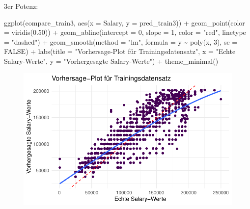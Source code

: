 \documentclass[
  letterpaper,
  DIV=11,
  numbers=noendperiod]{scrartcl}
\newenvironment{Shaded}{\begin{snugshade}}{\end{snugshade}}
\newcommand{\AttributeTok}[1]{\textcolor[rgb]{0.40,0.45,0.13}{#1}}
\newcommand{\ConstantTok}[1]{\textcolor[rgb]{0.56,0.35,0.01}{#1}}
\newcommand{\DecValTok}[1]{\textcolor[rgb]{0.68,0.00,0.00}{#1}}
\newcommand{\FloatTok}[1]{\textcolor[rgb]{0.68,0.00,0.00}{#1}}
\newcommand{\FunctionTok}[1]{\textcolor[rgb]{0.28,0.35,0.67}{#1}}
\newcommand{\NormalTok}[1]{\textcolor[rgb]{0.00,0.23,0.31}{#1}}
\newcommand{\SpecialCharTok}[1]{\textcolor[rgb]{0.37,0.37,0.37}{#1}}
\newcommand{\StringTok}[1]{\textcolor[rgb]{0.13,0.47,0.30}{#1}}
\begin{document}
3er Potenz:

\begin{Shaded}
\begin{Highlighting}[]
\FunctionTok{ggplot}\NormalTok{(compare\_train3, }\FunctionTok{aes}\NormalTok{(}\AttributeTok{x =}\NormalTok{ Salary, }\AttributeTok{y =}\NormalTok{ pred\_train3)) }\SpecialCharTok{+}
  \FunctionTok{geom\_point}\NormalTok{(}\AttributeTok{color =} \FunctionTok{viridis}\NormalTok{(}\FloatTok{0.50}\NormalTok{)) }\SpecialCharTok{+}
  \FunctionTok{geom\_abline}\NormalTok{(}\AttributeTok{intercept =} \DecValTok{0}\NormalTok{, }\AttributeTok{slope =} \DecValTok{1}\NormalTok{, }\AttributeTok{color =} \StringTok{"red"}\NormalTok{, }\AttributeTok{linetype =} \StringTok{"dashed"}\NormalTok{) }\SpecialCharTok{+}
  \FunctionTok{geom\_smooth}\NormalTok{(}\AttributeTok{method =} \StringTok{"lm"}\NormalTok{, }\AttributeTok{formula =}\NormalTok{ y }\SpecialCharTok{\textasciitilde{}} \FunctionTok{poly}\NormalTok{(x, }\DecValTok{3}\NormalTok{), }\AttributeTok{se =} \ConstantTok{FALSE}\NormalTok{) }\SpecialCharTok{+}
  \FunctionTok{labs}\NormalTok{(}\AttributeTok{title =} \StringTok{"Vorhersage{-}Plot für Trainingsdatensatz"}\NormalTok{,}
       \AttributeTok{x =} \StringTok{"Echte Salary{-}Werte"}\NormalTok{,}
       \AttributeTok{y =} \StringTok{"Vorhergesagte Salary{-}Werte"}\NormalTok{) }\SpecialCharTok{+}
  \FunctionTok{theme\_minimal}\NormalTok{()}
\end{Highlighting}
\end{Shaded}

\begin{figure}[H]

{\centering \includegraphics{main_doc_files/figure-pdf/unnamed-chunk-147-1.pdf}

}

\end{figure}
\end{document}
